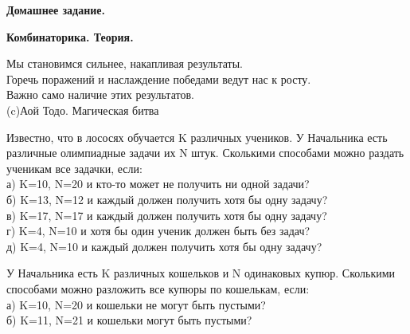 \centerline{\bf \Huge Домашнее задание.}
\centerline{\bf \Huge Комбинаторика. Теория.}

\begin{flushright}
        \scriptsize{Мы становимся сильнее, накапливая результаты.\\ Горечь поражений и наслаждение победами ведут нас к росту.\\ Важно само наличие этих результатов.\\ (c)Аой Тодо. Магическая битва}
\end{flushright}

 Известно, что в лососях обучается K различных учеников. У Начальника есть различные олимпиадные задачи их N штук. Сколькими способами можно раздать ученикам все задачки, если:\\
а) K=10, N=20 и кто-то может не получить ни одной задачи?\\
б) K=13, N=12 и каждый должен получить хотя бы одну задачу?\\
в) K=17, N=17 и каждый должен получить хотя бы одну задачу?\\
г) K=4, N=10 и хотя бы один ученик должен быть без задач?\\
д) K=4, N=10 и каждый должен получить хотя бы одну задачу?

 У Начальника есть K различных кошельков и N одинаковых купюр. Сколькими способами можно разложить все купюры по кошелькам, если:\\
а) K=10, N=20 и кошельки не могут быть пустыми?\\
б) K=11, N=21 и кошельки могут быть пустыми?